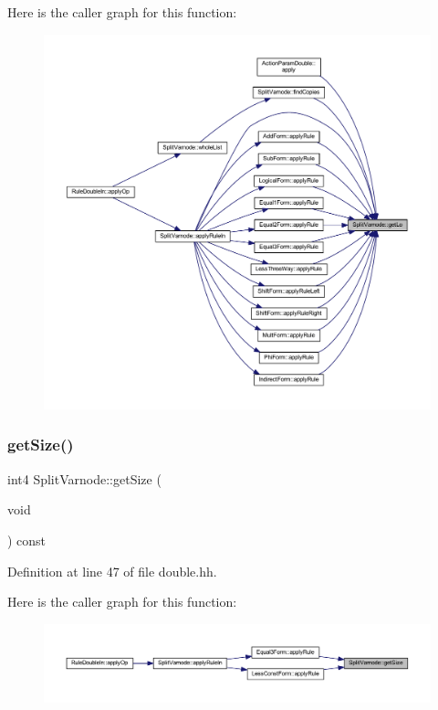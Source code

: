 Here is the caller graph for this function\+:
\nopagebreak
\begin{figure}[H]
\begin{center}
\leavevmode
\includegraphics[width=350pt]{class_split_varnode_abed66f1e261a68d2d138f811eb2d2ba0_icgraph}
\end{center}
\end{figure}
\mbox{\label{class_split_varnode_ad3a64fdae20a35ec05c3332612bd45de}} 
\subsubsection{\texorpdfstring{getSize()}{getSize()}}
{\footnotesize\ttfamily int4 Split\+Varnode\+::get\+Size (\begin{DoxyParamCaption}\item[{void}]{ }\end{DoxyParamCaption}) const\hspace{0.3cm}{\ttfamily [inline]}}



Definition at line 47 of file double.\+hh.

Here is the caller graph for this function\+:
\nopagebreak
\begin{figure}[H]
\begin{center}
\leavevmode
\includegraphics[width=350pt]{class_split_varnode_ad3a64fdae20a35ec05c3332612bd45de_icgraph}
\end{center}
\end{figure}
\mbox{\label{class_split_varnode_ad6de8bc5b9902d2870ef350aeea58c3e}} 
